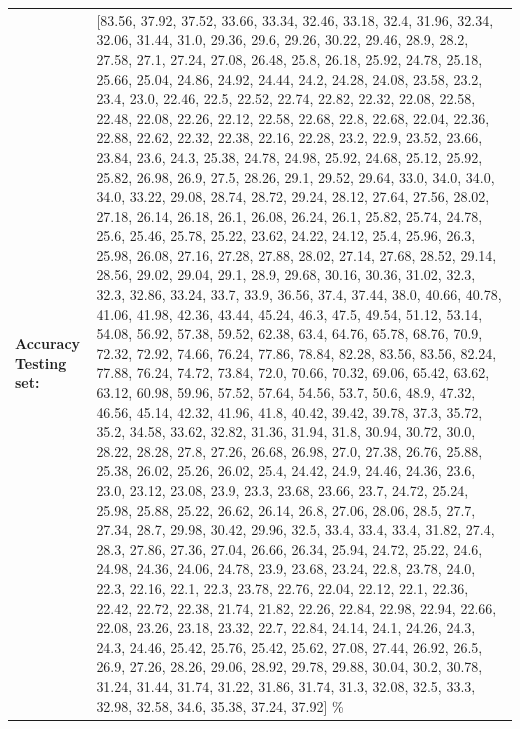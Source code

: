 \documentclass[parskip=half]{scrartcl}
\begin{document}
\begin{tabular}{l|l}
        \textbf{Accuracy Testing set:} & [83.56, 37.92, 37.52, 33.66, 33.34, 32.46, 33.18, 32.4, 31.96, 32.34, 32.06, 31.44, 31.0, 29.36, 29.6, 29.26, 30.22, 29.46, 28.9, 28.2, 27.58, 27.1, 27.24, 27.08, 26.48, 25.8, 26.18, 25.92, 24.78, 25.18, 25.66, 25.04, 24.86, 24.92, 24.44, 24.2, 24.28, 24.08, 23.58, 23.2, 23.4, 23.0, 22.46, 22.5, 22.52, 22.74, 22.82, 22.32, 22.08, 22.58, 22.48, 22.08, 22.26, 22.12, 22.58, 22.68, 22.8, 22.68, 22.04, 22.36, 22.88, 22.62, 22.32, 22.38, 22.16, 22.28, 23.2, 22.9, 23.52, 23.66, 23.84, 23.6, 24.3, 25.38, 24.78, 24.98, 25.92, 24.68, 25.12, 25.92, 25.82, 26.98, 26.9, 27.5, 28.26, 29.1, 29.52, 29.64, 33.0, 34.0, 34.0, 34.0, 33.22, 29.08, 28.74, 28.72, 29.24, 28.12, 27.64, 27.56, 28.02, 27.18, 26.14, 26.18, 26.1, 26.08, 26.24, 26.1, 25.82, 25.74, 24.78, 25.6, 25.46, 25.78, 25.22, 23.62, 24.22, 24.12, 25.4, 25.96, 26.3, 25.98, 26.08, 27.16, 27.28, 27.88, 28.02, 27.14, 27.68, 28.52, 29.14, 28.56, 29.02, 29.04, 29.1, 28.9, 29.68, 30.16, 30.36, 31.02, 32.3, 32.3, 32.86, 33.24, 33.7, 33.9, 36.56, 37.4, 37.44, 38.0, 40.66, 40.78, 41.06, 41.98, 42.36, 43.44, 45.24, 46.3, 47.5, 49.54, 51.12, 53.14, 54.08, 56.92, 57.38, 59.52, 62.38, 63.4, 64.76, 65.78, 68.76, 70.9, 72.32, 72.92, 74.66, 76.24, 77.86, 78.84, 82.28, 83.56, 83.56, 82.24, 77.88, 76.24, 74.72, 73.84, 72.0, 70.66, 70.32, 69.06, 65.42, 63.62, 63.12, 60.98, 59.96, 57.52, 57.64, 54.56, 53.7, 50.6, 48.9, 47.32, 46.56, 45.14, 42.32, 41.96, 41.8, 40.42, 39.42, 39.78, 37.3, 35.72, 35.2, 34.58, 33.62, 32.82, 31.36, 31.94, 31.8, 30.94, 30.72, 30.0, 28.22, 28.28, 27.8, 27.26, 26.68, 26.98, 27.0, 27.38, 26.76, 25.88, 25.38, 26.02, 25.26, 26.02, 25.4, 24.42, 24.9, 24.46, 24.36, 23.6, 23.0, 23.12, 23.08, 23.9, 23.3, 23.68, 23.66, 23.7, 24.72, 25.24, 25.98, 25.88, 25.22, 26.62, 26.14, 26.8, 27.06, 28.06, 28.5, 27.7, 27.34, 28.7, 29.98, 30.42, 29.96, 32.5, 33.4, 33.4, 33.4, 31.82, 27.4, 28.3, 27.86, 27.36, 27.04, 26.66, 26.34, 25.94, 24.72, 25.22, 24.6, 24.98, 24.36, 24.06, 24.78, 23.9, 23.68, 23.24, 22.8, 23.78, 24.0, 22.3, 22.16, 22.1, 22.3, 23.78, 22.76, 22.04, 22.12, 22.1, 22.36, 22.42, 22.72, 22.38, 21.74, 21.82, 22.26, 22.84, 22.98, 22.94, 22.66, 22.08, 23.26, 23.18, 23.32, 22.7, 22.84, 24.14, 24.1, 24.26, 24.3, 24.3, 24.46, 25.42, 25.76, 25.42, 25.62, 27.08, 27.44, 26.92, 26.5, 26.9, 27.26, 28.26, 29.06, 28.92, 29.78, 29.88, 30.04, 30.2, 30.78, 31.24, 31.44, 31.74, 31.22, 31.86, 31.74, 31.3, 32.08, 32.5, 33.3, 32.98, 32.58, 34.6, 35.38, 37.24, 37.92] \% \
        \end{tabular}
        
\end{document}
